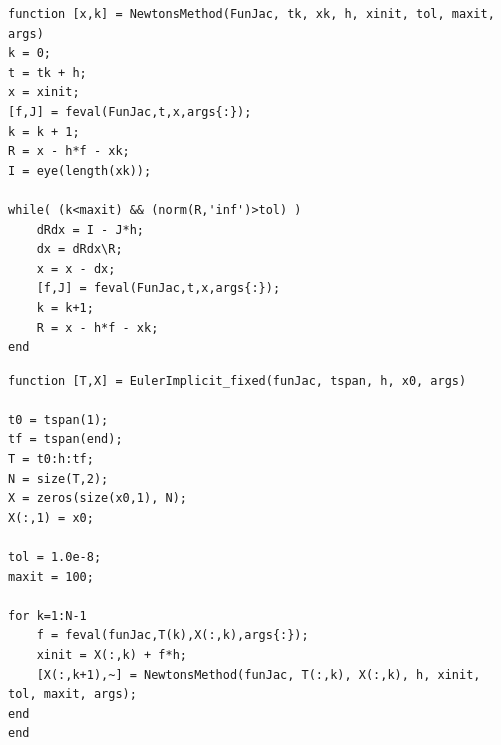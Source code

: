 \begin{lstlisting}[caption = Newton's method, captionpos=b, label=3_NewtonsMethod]
 function [x,k] = NewtonsMethod(FunJac, tk, xk, h, xinit, tol, maxit, args)
k = 0;
t = tk + h;
x = xinit;
[f,J] = feval(FunJac,t,x,args{:});
k = k + 1;
R = x - h*f - xk;
I = eye(length(xk));

while( (k<maxit) && (norm(R,'inf')>tol) )
    dRdx = I - J*h;
    dx = dRdx\R;
    x = x - dx;
    [f,J] = feval(FunJac,t,x,args{:});
    k = k+1;
    R = x - h*f - xk;
end

\end{lstlisting}
\begin{lstlisting}[caption = Implicit Euler method with fixed time step size, captionpos=b, label=3_ImEuler_fixed]
function [T,X] = EulerImplicit_fixed(funJac, tspan, h, x0, args)

t0 = tspan(1);
tf = tspan(end);
T = t0:h:tf;
N = size(T,2);
X = zeros(size(x0,1), N);
X(:,1) = x0;

tol = 1.0e-8;
maxit = 100;

for k=1:N-1
    f = feval(funJac,T(k),X(:,k),args{:});
    xinit = X(:,k) + f*h;
    [X(:,k+1),~] = NewtonsMethod(funJac, T(:,k), X(:,k), h, xinit, tol, maxit, args);
end
end

\end{lstlisting}

